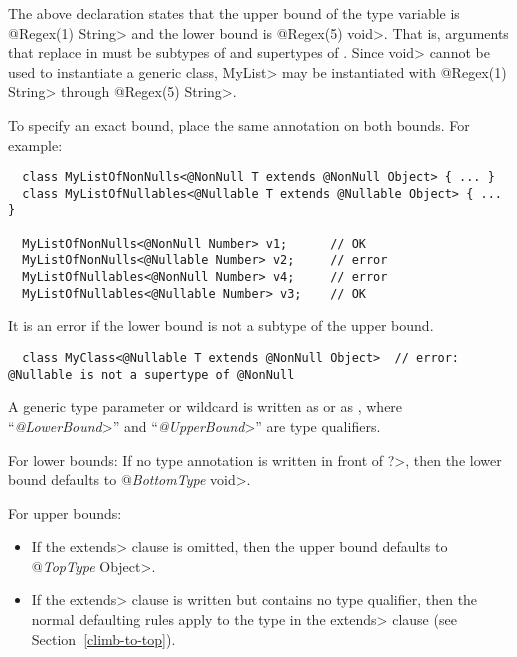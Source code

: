 The above declaration states that the upper bound of the type variable
is \<@Regex(1) String> and the lower bound is \<@Regex(5) void>.  That is,
arguments that replace  in  must be subtypes of
 and supertypes of .
Since \<void> cannot be used to instantiate a generic class, \<MyList> may
be instantiated with \<@Regex(1) String> through \<@Regex(5) String>.


To specify an exact bound, place the same annotation on both bounds.  For example:

\begin{Verbatim}
  class MyListOfNonNulls<@NonNull T extends @NonNull Object> { ... }
  class MyListOfNullables<@Nullable T extends @Nullable Object> { ... }

  MyListOfNonNulls<@NonNull Number> v1;      // OK
  MyListOfNonNulls<@Nullable Number> v2;     // error
  MyListOfNullables<@NonNull Number> v4;     // error
  MyListOfNullables<@Nullable Number> v3;    // OK
\end{Verbatim}

It is an error if the lower bound is not a subtype of the upper bound.

\begin{smaller}
\begin{Verbatim}
  class MyClass<@Nullable T extends @NonNull Object>  // error: @Nullable is not a supertype of @NonNull
\end{Verbatim}
\end{smaller}



A generic type parameter or wildcard is written as  or as
, where
``\<\emph{@LowerBound}>'' and ``\<\emph{@UpperBound}>'' are type qualifiers.

For lower bounds:
If no type annotation is written in front of \<?>,
then the lower bound defaults to \<@\emph{BottomType} void>.

For upper bounds:
\begin{itemize}
\item
If the \<extends> clause is omitted,
then the upper bound defaults to \<@\emph{TopType} Object>.
\item
If the \<extends> clause is written but contains no type qualifier,
then the normal defaulting rules apply to the type in the \<extends>
clause (see Section~\ref{climb-to-top}).
\end{itemize}

